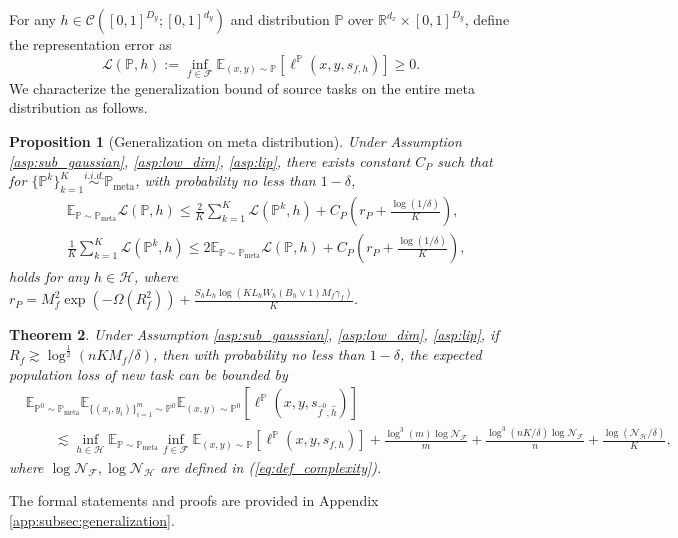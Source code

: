 \documentclass{article}
\numberwithin{equation}{section}
\def\eqref#1{equation~\ref{#1}}
\newcommand{\E}{\mathbb{E}}
\newcommand{\R}{\mathbb{R}}
\newtheorem{thm}{Theorem}[section]
\newtheorem{prop}[thm]{Proposition}
\theoremstyle{definition}
\newcommand{\Pmeta}{\mathbb{P}_{\text{meta}}}
\renewcommand{\P}{\mathbb{P}}
\renewcommand{\eqref}[1]{(\ref{#1})}
\begin{document}
For any $h\in\mathcal{C}([0,1]^{D_y};[0,1]^{d_y})$ and distribution $\P$ over $\R^{d_x}\times[0,1]^{D_y}$, define the representation error as
\begin{equation}\label{eq:L(P,h)}
    \mathcal{L}(\P,h):=\inf_{f\in\mathcal{F}} \E_{(x,y)\sim\P}[\ell^\P(x,y,s_{f,h})]\geq 0.
\end{equation}
We characterize the generalization bound of source tasks on the entire meta distribution as follows.
\begin{prop}[Generalization on meta distribution] \label{prop:generalization_meta_informal}
    Under Assumption \ref{asp:sub_gaussian}, \ref{asp:low_dim}, \ref{asp:lip}, 
    there exists constant $C_P$
    such that for $\{\P^k\}_{k=1}^K\overset{\textit{i.i.d.}}{\sim}\Pmeta$,
    with probability no less than $1-\delta$, 
    \begin{align}
        &\E_{\P\sim\Pmeta}\mathcal{L}(\P,h)
        \leq \frac{2}{K}\sum_{k=1}^K\mathcal{L}(\P^k,h)+C_P\left(r_P+\frac{\log(1/\delta)}{K}\right), \\
        &\frac{1}{K}\sum_{k=1}^K\mathcal{L}(\P^k,h)\leq 2\E_{\P\sim\Pmeta}\mathcal{L}(\P,h)
        +C_P\left(r_P+\frac{\log(1/\delta)}{K}\right),
    \end{align}
    holds for any $h\in\mathcal{H}$, where $r_P=M_f^2\exp(-\Omega(R_f^2))+\frac{S_hL_h\log\left(KL_hW_h(B_h\vee 1)M_f\gamma_f\right)}{K}$.
\end{prop}

\begin{thm}\label{thm:generalization_all_informal}
    Under Assumption \ref{asp:sub_gaussian}, \ref{asp:low_dim}, \ref{asp:lip},
    if $R_f\gtrsim\log^{\frac{1}{2}}(nKM_f/\delta)$,
    then with probability no less than $1-\delta$, the expected population loss of new task can be bounded by
    \begin{equation}
        \begin{aligned}
            &\E_{\P^0\sim\Pmeta}\E_{\{(x_i,y_i)\}_{i=1}^m\sim \P^0} \E_{(x,y)\sim\P^0} [\ell^\P(x,y,s_{\widehat{f}^0,\widehat{h}})] \\
            &\qquad \lesssim \inf_{h\in\mathcal{H}} \E_{\P\sim\Pmeta} \inf_{f\in\mathcal{F}}\E_{(x,y)\sim\P} [\ell^\P (x,y,s_{f,h})] + \frac{\log^3(m)\log\mathcal{N}_\mathcal{F}}{m} + \frac{\log^3(nK/\delta)\log\mathcal{N}_\mathcal{F}}{n}+\frac{\log(\mathcal{N}_\mathcal{H}/\delta)}{K},
        \end{aligned}
    \end{equation}
    where $\log\mathcal{N}_\mathcal{F},\log\mathcal{N}_\mathcal{H}$ are defined in \eqref{eq:def_complexity}.
\end{thm}
The formal statements and proofs are provided in Appendix \ref{app:subsec:generalization}.
\end{document}
